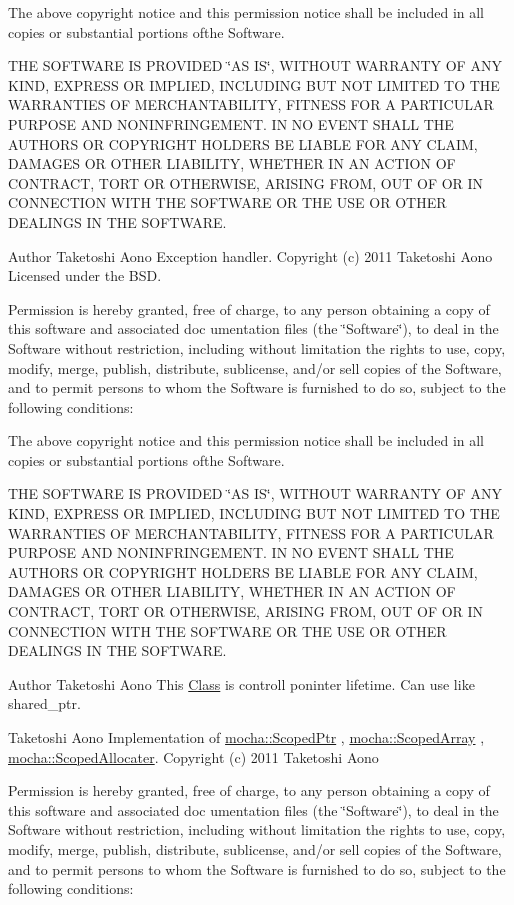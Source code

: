 The above copyright notice and this permission notice shall be included in all copies or substantial portions ofthe Software.

THE SOFTWARE IS PROVIDED \char`\"{}AS IS\char`\"{}, WITHOUT WARRANTY OF ANY KIND, EXPRESS OR IMPLIED, INCLUDING BUT NOT LIMITED TO THE WARRANTIES OF MERCHANTABILITY, FITNESS FOR A PARTICULAR PURPOSE AND NONINFRINGEMENT. IN NO EVENT SHALL THE AUTHORS OR COPYRIGHT HOLDERS BE LIABLE FOR ANY CLAIM, DAMAGES OR OTHER LIABILITY, WHETHER IN AN ACTION OF CONTRACT, TORT OR OTHERWISE, ARISING FROM, OUT OF OR IN CONNECTION WITH THE SOFTWARE OR THE USE OR OTHER DEALINGS IN THE SOFTWARE.

\begin{DoxyAuthor}{Author}
Taketoshi Aono  Exception handler.  Copyright (c) 2011 Taketoshi Aono Licensed under the BSD.
\end{DoxyAuthor}
Permission is hereby granted, free of charge, to any person obtaining a copy of this software and associated doc umentation files (the \char`\"{}Software\char`\"{}), to deal in the Software without restriction, including without limitation the rights to use, copy, modify, merge, publish, distribute, sublicense, and/or sell copies of the Software, and to permit persons to whom the Software is furnished to do so, subject to the following conditions:

The above copyright notice and this permission notice shall be included in all copies or substantial portions ofthe Software.

THE SOFTWARE IS PROVIDED \char`\"{}AS IS\char`\"{}, WITHOUT WARRANTY OF ANY KIND, EXPRESS OR IMPLIED, INCLUDING BUT NOT LIMITED TO THE WARRANTIES OF MERCHANTABILITY, FITNESS FOR A PARTICULAR PURPOSE AND NONINFRINGEMENT. IN NO EVENT SHALL THE AUTHORS OR COPYRIGHT HOLDERS BE LIABLE FOR ANY CLAIM, DAMAGES OR OTHER LIABILITY, WHETHER IN AN ACTION OF CONTRACT, TORT OR OTHERWISE, ARISING FROM, OUT OF OR IN CONNECTION WITH THE SOFTWARE OR THE USE OR OTHER DEALINGS IN THE SOFTWARE.

\begin{DoxyAuthor}{Author}
Taketoshi Aono  This \hyperlink{classmocha_1_1_class}{Class} is controll poninter lifetime. Can use like shared\_\-ptr.

Taketoshi Aono  Implementation of \hyperlink{classmocha_1_1_scoped_ptr}{mocha::ScopedPtr} , \hyperlink{classmocha_1_1_scoped_array}{mocha::ScopedArray} , \hyperlink{classmocha_1_1_scoped_allocater}{mocha::ScopedAllocater}.  Copyright (c) 2011 Taketoshi Aono
\end{DoxyAuthor}
Permission is hereby granted, free of charge, to any person obtaining a copy of this software and associated doc umentation files (the \char`\"{}Software\char`\"{}), to deal in the Software without restriction, including without limitation the rights to use, copy, modify, merge, publish, distribute, sublicense, and/or sell copies of the Software, and to permit persons to whom the Software is furnished to do so, subject to the following conditions:

